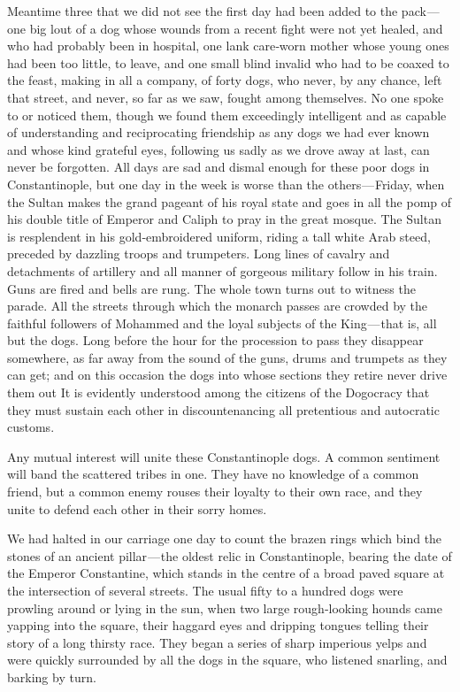 \documentclass[12pt]{book}
\begin{document}
Meantime three that we did not see the first day had been added to the
pack — one big lout of a dog whose wounds from a recent fight were not yet
healed, and who had probably been in hospital, one lank care‐worn mother whose
young ones had been too little, to leave, and one small blind invalid who had to
be coaxed to the feast, making in all a company, of forty dogs, who never, by any
chance, left that street, and never, so far as we saw, fought among themselves.
No one spoke to or noticed them, though we found them exceedingly intelligent
and as capable of understanding and reciprocating friendship as any dogs we had
ever known and whose kind grateful eyes, following us sadly as we drove away
at last, can never be forgotten. All days are sad and dismal enough for these poor
dogs in Constantinople, but one day in the week is worse than the others — Friday,
when the Sultan makes the grand pageant of his royal state and goes in all the
pomp of his double title of Emperor and Caliph to pray in the great mosque. The
Sultan is resplendent in his gold‐embroidered uniform, riding a tall white Arab
steed, preceded by dazzling troops and trumpeters. Long lines of cavalry and
detachments of artillery and all manner of gorgeous military follow in his train.
Guns are fired and bells are rung. The whole town turns out to witness the parade.
All the streets through which the monarch passes are crowded by the faithful
followers of Mohammed and the loyal subjects of the King — that is, all but the
dogs. Long before the hour for the procession to pass they disappear somewhere,
as far away from the sound of the guns, drums and trumpets as they can get; and
on this occasion the dogs into whose sections they retire never drive them out
It is evidently understood among the citizens of the Dogocracy that they must
sustain each other in discountenancing all pretentious and autocratic customs.

Any mutual interest will unite these Constantinople dogs. A common sentiment will band the scattered tribes in one. They have no knowledge of a common
friend, but a common enemy rouses their loyalty to their own race, and they unite
to defend each other in their sorry homes.

We had halted in our carriage one day to count the brazen rings which bind
the stones of an ancient pillar — the oldest relic in Constantinople, bearing the
date of the Emperor Constantine, which stands in the centre of a broad paved
square at the intersection of several streets. The usual fifty to a hundred dogs
were prowling around or lying in the sun, when two large rough‐looking hounds
came yapping into the square, their haggard eyes and dripping tongues telling
their story of a long thirsty race. They began a series of sharp imperious yelps
and were quickly surrounded by all the dogs in the square, who listened snarling,
and barking by turn.
\end{document}
